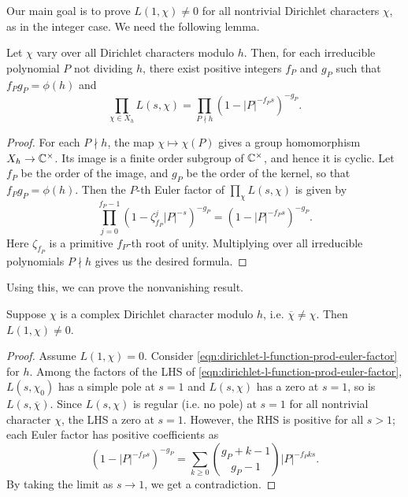 Our main goal is to prove $L(1, \chi) \ne 0$ for all nontrivial Dirichlet characters $\chi$, as in the integer case.
We need the following lemma.
\begin{lemma}
    Let $\chi$ vary over all Dirichlet characters modulo $h$.
    Then, for each irreducible polynomial $P$ not dividing $h$, there exist positive integers $f_P$ and $g_P$ such that $f_P g_P = \phi(h)$ and
    \begin{equation}
        \prod_{\chi \in X_h} L(s, \chi) = \prod_{P \nmid h} (1 - |P|^{-f_P s})^{-g_P}.
        \label{eqn:dirichlet-l-function-prod-euler-factor}
    \end{equation}
\end{lemma}
\begin{proof}
    For each $P \nmid h$, the map $\chi \mapsto \chi(P)$ gives a group homomorphism $X_h \to \mathbb{C}^\times$.
    Its image is a finite order subgroup of $\mathbb{C}^\times$, and hence it is cyclic.
    Let $f_P$ be the order of the image, and $g_P$ be the order of the kernel, so that $f_P g_P = \phi(h)$.
    Then the $P$-th Euler factor of $\prod_\chi L(s, \chi)$ is given by
    \[
    \prod_{j=0}^{f_P - 1} (1 - \zeta_{f_P}^j |P|^{-s})^{-g_P} = (1 - |P|^{-f_P s})^{-g_P}.
    \]
    Here $\zeta_{f_P}$ is a primitive $f_P$-th root of unity.
    Multiplying over all irreducible polynomials $P \nmid h$ gives us the desired formula.
\end{proof}

Using this, we can prove the nonvanishing result.
\begin{lemma}
    Suppose $\chi$ is a complex Dirichlet character modulo $h$, i.e. $\overline{\chi} \ne \chi$.
    Then $L(1, \chi) \ne 0$.
\end{lemma}
\begin{proof}
    Assume $L(1, \chi) = 0$.
    Consider \eqref{eqn:dirichlet-l-function-prod-euler-factor} for $h$.
    Among the factors of the LHS of \eqref{eqn:dirichlet-l-function-prod-euler-factor}, $L(s, \chi_0)$ has a simple pole at $s = 1$ and $L(s, \chi)$ has a zero at $s = 1$, so is $L(s, \overline{\chi})$.
    Since $L(s, \chi)$ is regular (i.e. no pole) at $s = 1$ for all nontrivial character $\chi$, the LHS a zero at $s = 1$.
    However, the RHS is positive for all $s > 1$; each Euler factor has positive coefficients as
    \[
    (1 - |P|^{-f_P s})^{-g_P} = \sum_{k \ge 0} \binom{g_P + k - 1}{g_P - 1} |P|^{-f_P k s}.
    \]
    By taking the limit as $s \to 1$, we get a contradiction.
\end{proof}

